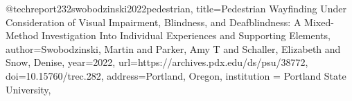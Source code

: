 @techreport{232swobodzinski2022pedestrian,
title={Pedestrian Wayfinding Under Consideration of Visual Impairment, Blindness, and Deafblindness: A Mixed-Method Investigation Into Individual Experiences and Supporting Elements},
author={Swobodzinski, Martin and Parker, Amy T and Schaller, Elizabeth and Snow, Denise},
year={2022},
url={https://archives.pdx.edu/ds/psu/38772},
doi={10.15760/trec.282},
address={Portland, Oregon},
institution = {Portland State University},
}